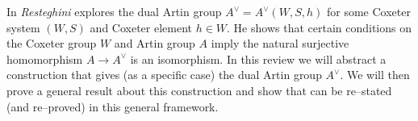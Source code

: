 In \cite{resteghini_free_2024} \emph{Resteghini} explores the dual Artin group $A^\vee = A^\vee(W,S,h)$ for some Coxeter system $(W,S)$ and Coxeter element $h \in W$.
He shows that certain conditions on the Coxeter group $W$ and Artin group $A$ imply the natural surjective homomorphism $A \to A^\vee$ is an isomorphism.
In this review we will abstract a construction that gives (as a specific case) the dual Artin group $A^\vee$.
We will then prove a general result about this construction and show that \cite[Proposition 3.9]{resteghini_free_2024} can be re--stated (and re--proved) in this general framework.

